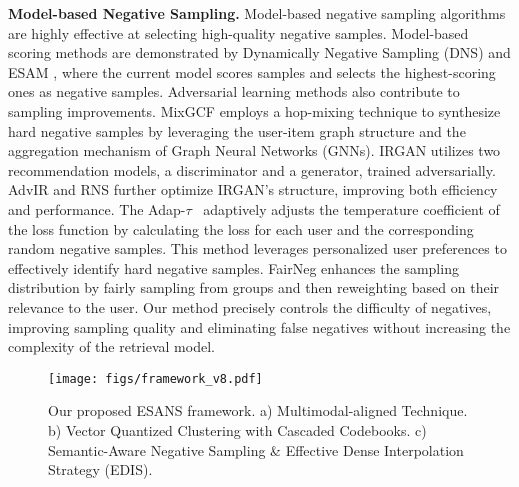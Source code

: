\noindent \textbf{Model-based Negative Sampling.}
Model-based negative sampling algorithms are highly effective at selecting high-quality negative samples. Model-based scoring methods are demonstrated by Dynamically Negative Sampling (DNS) \citep{zhang2013optimizing} and ESAM \citep{chen2020esam}, where the current model scores samples and selects the highest-scoring ones as negative samples. Adversarial learning methods also contribute to sampling improvements. 
MixGCF \citep{huang2021mixgcf} employs a hop-mixing technique to synthesize hard negative samples by leveraging the user-item graph structure and the aggregation mechanism of Graph Neural Networks (GNNs). IRGAN \citep{wang2017irgan} utilizes two recommendation models, a discriminator and a generator, trained adversarially. AdvIR \citep{park2019adversarial} and RNS \citep{ding2019reinforced} further optimize IRGAN's structure, improving both efficiency and performance. The Adap-$\tau$\ \citep{chen2023adap} adaptively adjusts the temperature coefficient of the loss function by calculating the loss for each user and the corresponding random negative samples. This method leverages personalized user preferences to effectively identify hard negative samples. FairNeg \citep{chen2023fairly} enhances the sampling distribution by fairly sampling from groups and then reweighting based on their relevance to the user. Our method precisely controls the difficulty of negatives, improving sampling quality and eliminating false negatives without increasing the complexity of the retrieval model.


\begin{figure*}[htbp]
  \texttt{[image: figs/framework\_v8.pdf]}
  \caption{Our proposed ESANS framework. a) Multimodal-aligned Technique. b) Vector Quantized Clustering with Cascaded Codebooks. c) Semantic-Aware Negative Sampling \& Effective Dense Interpolation Strategy (EDIS).}
  \label{fig:frameworkb}
\end{figure*}